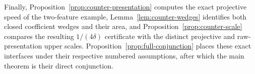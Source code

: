 Finally, Proposition~\ref{prop:counter-presentation} computes the exact
projective speed of the two-feature example,
Lemma~\ref{lem:counter-wedges} identifies both closed coefficient wedges and
their area, and Proposition~\ref{prop:counter-scale} compares the resulting
$1/(4\delta)$ certificate with the distinct projective and raw-presentation
upper scales.  Proposition~\ref{prop:full-conjunction} places these exact
interfaces under their respective numbered assumptions, after which the main
theorem is their direct conjunction.
